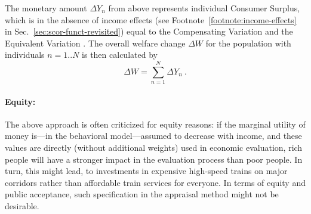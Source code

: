 
The monetary amount $\Delta Y_n$ from above represents individual Consumer Surplus, which is in the absence of income effects (see Footnote~\ref{footnote:income-effects} in Sec.~\ref{sec:scor-funct-revisited}) equal to the Compensating Variation and the Equivalent Variation \citep{DalyEtAl2008WelfareMeasuresIncome}.
%
The overall welfare change $\Delta W$ for the population with individuals $n=1..N$ is then calculated by
%
\begin{equation}
\label{eq:ch:economicEval:monetizationWtPAggregate}
\Delta W = \sum_{n=1}^N \Delta Y_n \ .
\end{equation}

\paragraph*{Equity:}

The above approach is often criticized for equity reasons: if the marginal utility of money is---in the behavioral model---assumed to decrease with income, and these values are directly (without additional weights) used in economic evaluation, rich people will have a stronger impact in the evaluation process than poor people. In turn, this might lead, \eg to investments in expensive high-speed trains on major corridors rather than affordable train services for everyone. In terms of equity and public acceptance, such specification in the appraisal method might not be desirable.


